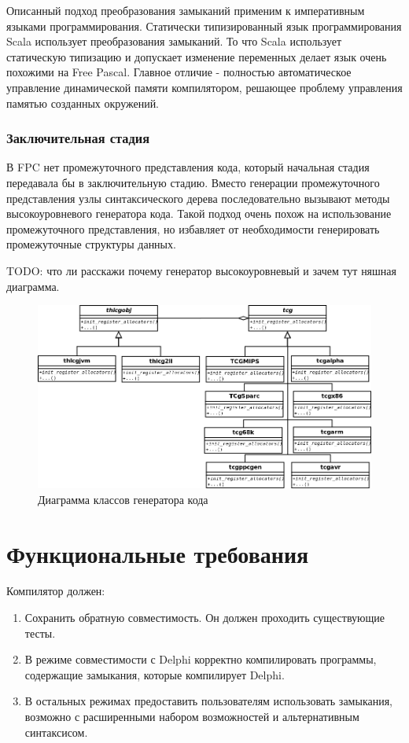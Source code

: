 \documentclass{imcs}
\begin{document}
Описанный подход преобразования замыканий применим к императивным языками
программирования. Статически типизированный язык программирования Scala
использует преобразования замыканий\cite{scalaoverview}\cite{scalaclosure}. То что
Scala использует статическую типизацию и допускает изменение переменных делает
язык очень похожими на Free Pascal. Главное отличие - полностью автоматическое
управление динамической памяти компилятором, решающее проблему управления памятью
созданных окружений.

\subsubsection{Заключительная стадия}

В FPC нет промежуточного представления кода, который начальная стадия
передавала бы в заключительную стадию. Вместо генерации промежуточного представления
узлы синтаксического дерева последовательно вызывают методы высокоуровневого генератора
кода. Такой подход очень похож на использование промежуточного представления, но
избавляет от необходимости генерировать промежуточные структуры данных.

TODO: что ли расскажи почему генератор высокоуровневый и зачем тут няшная диаграмма.

\begin{figure}[htb]
\centering
\includegraphics[width=\textwidth]{./uml/cgen.png}
\caption{Диаграмма классов генератора кода}
\end{figure}

\section{Функциональные требования}
Компилятор должен:
\begin{enumerate}
    \item Сохранить обратную совместимость. Он должен проходить существующие тесты. 
    \item В режиме совместимости с Delphi корректно компилировать программы,
содержащие замыкания, которые компилирует Delphi.
    \item В остальных режимах предоставить пользователям использовать замыкания,
возможно с расширенными набором возможностей и альтернативным синтаксисом.
\end{enumerate}
        
\end{document}
